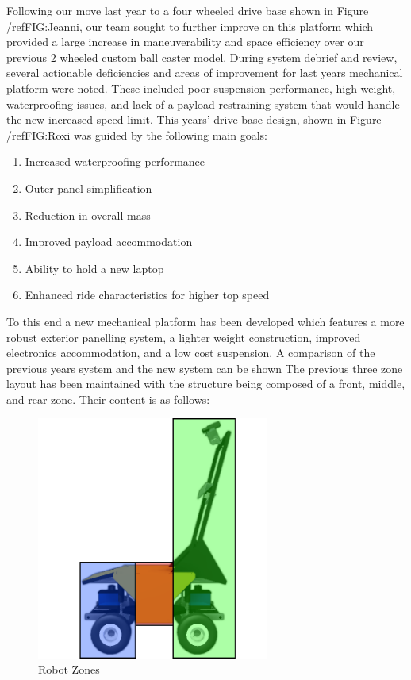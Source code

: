 Following our move last year to a four wheeled drive base shown in Figure /ref{FIG:Jeanni}, our team sought to further improve on this platform which provided a large increase in maneuverability and space efficiency over our previous 2 wheeled custom ball caster model. During system debrief and review, several actionable deficiencies and areas of improvement for last years mechanical platform were noted. These included poor suspension performance, high weight, waterproofing issues, and lack of a payload restraining system that would handle the new increased speed limit. This years' drive base design, shown in Figure /ref{FIG:Roxi} was guided by the following main goals:

\begin{enumerate}
\item Increased waterproofing performance
\item Outer panel simplification
\item Reduction in overall mass
\item Improved payload accommodation
\item Ability to hold a new laptop
\item Enhanced ride characteristics for higher top speed
\end{enumerate}

To this end a new mechanical platform has been developed which features a more robust exterior panelling system, a lighter weight construction, improved electronics accommodation, and a low cost suspension. A comparison of the previous years system and the new system can be shown The previous three zone layout has been maintained with the structure being composed of a front, middle, and rear zone. Their content is as follows:

\begin{figure}[H]
\begin{center}
\includegraphics[width=3in]{./pics/RobotZones.png}
\caption{Robot Zones}
\label{FIG:Zones}
\end{center}
\end{figure}

